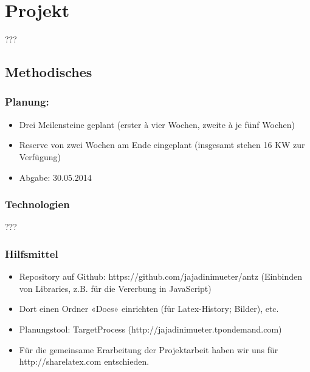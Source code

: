 
\chapter{Projekt}

???

\section{Methodisches}


\subsection*{Planung:}

\begin{itemize}[noitemsep]
\item Drei Meilensteine geplant (erster à vier Wochen, zweite à je fünf Wochen)
\item Reserve von zwei Wochen am Ende eingeplant (insgesamt stehen 16 KW zur Verfügung)
\item Abgabe: 30.05.2014
\end{itemize}


\vspace*{1cm}


\subsection{Technologien}

???


\subsection{Hilfsmittel}

\begin{itemize}[noitemsep]
\item Repository auf Github: https://github.com/jajadinimueter/antz (Einbinden von Libraries, z.B. für die Vererbung in JavaScript)
\item Dort einen Ordner «Docs» einrichten (für Latex-History; Bilder), etc.
\item Planungstool: TargetProcess (http://jajadinimueter.tpondemand.com)
\item Für die gemeinsame Erarbeitung der Projektarbeit haben wir uns für http://sharelatex.com entschieden.
\end{itemize}



